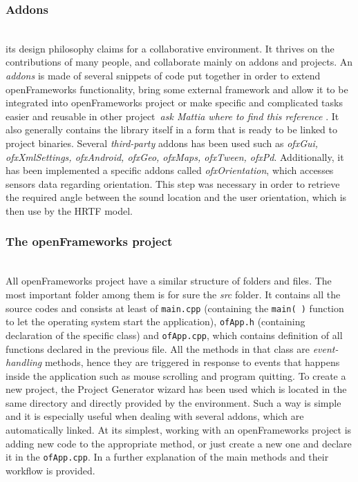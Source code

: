 \documentclass[journal]{IEEEtran}
\begin{document}
\subsubsection{Addons}~\\
its design philosophy claims for a collaborative environment. It thrives on the contributions of many people, and collaborate mainly on addons and projects. An \emph{addons} is made of several snippets of code put together in order to extend openFrameworks functionality, bring some external framework and allow it to be integrated into openFrameworks project or make specific and complicated tasks easier and reusable in other project~\cite{}{\footnotesize{\textit{ask Mattia where to find this reference}}} . It also generally contains the library itself in a form that is ready to be linked to project binaries.
Several \textit{third-party} addons has been used such as \emph{ofxGui, ofxXmlSettings, ofxAndroid, ofxGeo, ofxMaps, ofxTween, ofxPd}. Additionally, it has been implemented a specific addons called \emph{ofxOrientation}, which accesses sensors data regarding orientation. This step was necessary in order to retrieve the required angle between the sound location and the user orientation, which is then use by the HRTF model.

\subsubsection{The openFrameworks project}~\\
All openFrameworks project have a similar structure of folders and files. The most important folder among them is for sure the \emph{src} folder. It contains all the source codes and consists at least of \texttt{main.cpp} (containing the \texttt{main( )} function to let the operating system start the application), \texttt{ofApp.h} (containing declaration of the specific class) and \texttt{ofApp.cpp}, which contains definition of all functions declared in the previous file. All the methods in that class are \emph{event-handling} methods, hence they are triggered in response to events that happens inside the application such as mouse scrolling and program quitting.%
To create a new project, the Project Generator wizard has been used which is located in the same directory and directly provided by the environment. Such a way is simple and it is especially useful when dealing with several addons, which are automatically linked. 
At its simplest, working with an openFrameworks project is adding new code to the appropriate method, or just create a new one and declare it in the \texttt{ofApp.cpp}. In a further explanation of the main methods and their workflow is provided.
\end{document}
